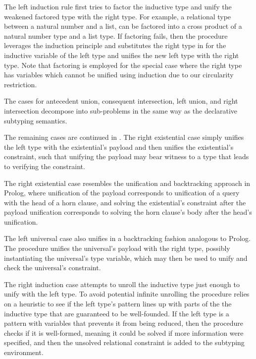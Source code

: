 \documentclass[acmsmall]{acmart}
\theoremstyle{definition}
\begin{document}
The left induction rule first tries to factor the inductive type and unify the weakened factored type
with the right type. For example, a relational type between a natural number and a list, can be factored into
a cross product of a natural number type and a list type. 
If factoring fails, then the procedure leverages the induction principle and substitutes the right type 
in for the inductive variable of the left type and unifies the new left type with the right type.    
Note that factoring is employed for the special
case where the right type has variables which cannot be unified 
using induction due to our circularity restriction.  

The cases for antecedent union, consequent intersection, left union, and right intersection
decompose into sub-problems in the same way as the declarative subtyping semantics.

The remaining cases are continued in .
The right existential case simply unifies the left type with the existential's payload
and then unifies the existential's constraint, such that unifying the payload
may bear witness to a type that leads to verifying the constraint. 


The right existential case resembles the unification and backtracking approach in Prolog, 
where unification of the payload corresponds to unification of a query with the head of a horn clause,
and solving the existential's constraint after the payload unification corresponds to
solving the horn clause's body after the head's unification.  

The left universal case also unifies in a backtracking fashion analogous to Prolog.
The procedure unifies the universal's payload with the right type,
possibly instantiating the universal's type variable,
which may then be used to unify and check the universal's constraint.

The right induction case attempts to unroll the inductive type just enough
to unify with the left type. To avoid potential infinite unrolling
the procedure relies on a heuristic to see if the left type's pattern
lines up with parts of the the inductive type that are guaranteed to be well-founded. 
If the left type is a pattern with variables that prevents it from being reduced,
then the procedure checks if it is well-formed, meaning it could be solved 
if more information were specified, and then the unsolved relational constraint
is added to the subtyping environment. 
\end{document}
